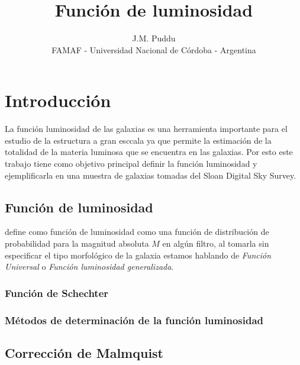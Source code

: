 \documentclass[twocolumn]{article}
\title{Función de luminosidad}
\author{J.M. Puddu \\ FAMAF - Universidad Nacional de Córdoba - Argentina}
\begin{document}

\section{Introducción}
La función luminosidad de las galaxias es una herramienta importante para el estudio de la estructura a gran esccala ya que permite la estimación de la totalidad de la materia luminosa que se encuentra en las galaxias. Por esto este trabajo tiene como objetivo principal definir la función luminosidad y ejemplificarla en una muestra de galaxias tomadas del Sloan Digital Sky Survey.


\subsection{Función de luminosidad}
\citet{Binggeli1988} define como función de luminosidad como una función de distribución de probabilidad para la magnitud absoluta $M$ en algún filtro, al tomarla sin especificar el tipo morfológico de la galaxia estamos hablando de \textit{Función Universal} o \textit{Función luminosidad generalizada}.



\subsubsection{Función de Schechter}

\subsubsection{Métodos de determinación de la función luminosidad}

\subsection{Corrección de Malmquist}
\end{document}
